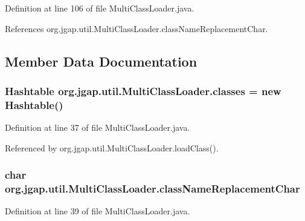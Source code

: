 Definition at line 106 of file Multi\-Class\-Loader.\-java.



References org.\-jgap.\-util.\-Multi\-Class\-Loader.\-class\-Name\-Replacement\-Char.



\subsection{Member Data Documentation}
\hypertarget{classorg_1_1jgap_1_1util_1_1_multi_class_loader_a9bf208aab68f40238eaa34493dd8c6ee}{
\subsubsection[{classes}]{\setlength{\rightskip}{0pt plus 5cm}Hashtable org.\-jgap.\-util.\-Multi\-Class\-Loader.\-classes = new Hashtable()\hspace{0.3cm}{\ttfamily [private]}}}\label{classorg_1_1jgap_1_1util_1_1_multi_class_loader_a9bf208aab68f40238eaa34493dd8c6ee}


Definition at line 37 of file Multi\-Class\-Loader.\-java.



Referenced by org.\-jgap.\-util.\-Multi\-Class\-Loader.\-load\-Class().

\hypertarget{classorg_1_1jgap_1_1util_1_1_multi_class_loader_a0e255f36a9c6dd5fa577f5bbd1869a94}{
\subsubsection[{class\-Name\-Replacement\-Char}]{\setlength{\rightskip}{0pt plus 5cm}char org.\-jgap.\-util.\-Multi\-Class\-Loader.\-class\-Name\-Replacement\-Char\hspace{0.3cm}{\ttfamily [private]}}}\label{classorg_1_1jgap_1_1util_1_1_multi_class_loader_a0e255f36a9c6dd5fa577f5bbd1869a94}


Definition at line 39 of file Multi\-Class\-Loader.\-java.



